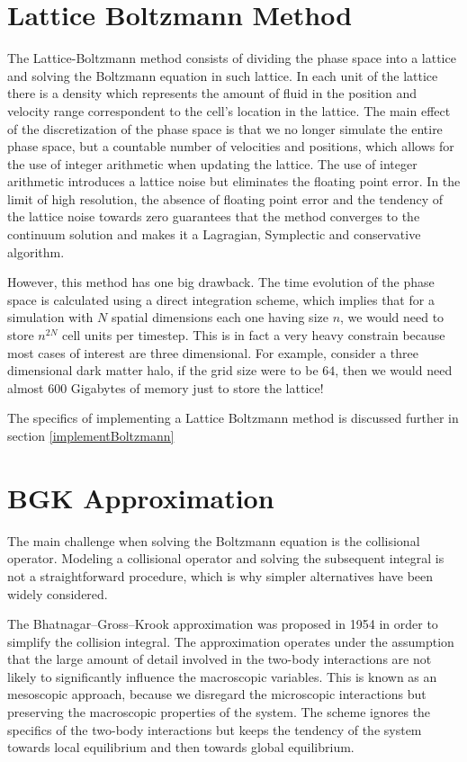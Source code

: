 \section{Lattice Boltzmann Method}
\label{boltz}
The Lattice-Boltzmann method consists of dividing the phase space into a lattice and solving the Boltzmann equation in such lattice. In each unit of the lattice there is a density which represents the amount of fluid in the position and velocity range correspondent to the cell's location in the lattice.
The main effect of the discretization of the phase space is that we no longer simulate the entire phase space, but a countable number of velocities and positions, which allows for the use of integer arithmetic when updating the lattice. The use of integer arithmetic introduces a lattice noise but eliminates the floating point error. In the limit of high resolution, the absence of floating point error and the tendency of the lattice noise towards zero guarantees that the method converges to the continuum solution and makes it a Lagragian, Symplectic and conservative algorithm. 

However, this method has one big drawback. The time evolution of the phase space is calculated using a direct integration scheme, which implies that for a simulation with $N$ spatial dimensions each one having size $n$, we would need to store $n^{2N}$ cell units per timestep. This is in fact a very heavy constrain because most cases of interest are three dimensional. For example, consider a three dimensional dark matter halo, if the grid size were to be $64$, then we would need almost 600 Gigabytes of memory just to store the lattice! 

The specifics of implementing a Lattice Boltzmann method is discussed further in section \ref{implementBoltzmann} 


\section{BGK Approximation}
\label{bgk}
The main challenge when solving the Boltzmann equation is the collisional operator. Modeling a collisional operator and solving the subsequent integral is not a straightforward procedure, which is why simpler alternatives have been widely considered.

The Bhatnagar–Gross–Krook approximation was proposed in 1954 \cite{1954PhRv...94..511B} in order to simplify the collision integral.
The approximation operates under the assumption that the large amount of detail involved in the two-body interactions are not likely to significantly influence the macroscopic variables\cite{asinari}.
This is known as an mesoscopic approach, because we disregard the microscopic interactions but preserving the macroscopic properties of the system. 
The scheme ignores the specifics of the two-body interactions but keeps the tendency of the system towards local equilibrium and then towards global equilibrium.

